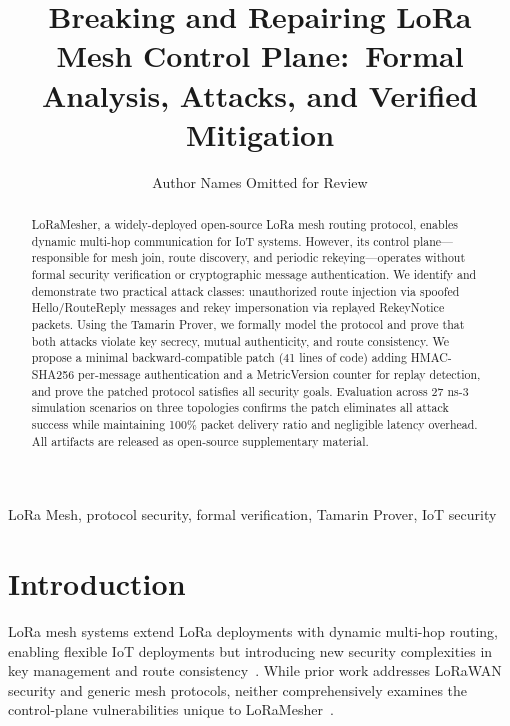\documentclass[10pt,journal]{IEEEtran}
\begin{document}
\title{Breaking and Repairing LoRa Mesh Control Plane:\ Formal Analysis, Attacks, and Verified Mitigation}
\author{Author Names Omitted for Review}
\maketitle

\begin{abstract}
	LoRaMesher, a widely-deployed open-source LoRa mesh routing protocol, enables dynamic multi-hop communication for IoT systems. However, its control plane—responsible for mesh join, route discovery, and periodic rekeying—operates without formal security verification or cryptographic message authentication. We identify and demonstrate two practical attack classes: unauthorized route injection via spoofed Hello/RouteReply messages and rekey impersonation via replayed RekeyNotice packets. Using the Tamarin Prover, we formally model the protocol and prove that both attacks violate key secrecy, mutual authenticity, and route consistency. We propose a minimal backward-compatible patch (41 lines of code) adding HMAC-SHA256 per-message authentication and a MetricVersion counter for replay detection, and prove the patched protocol satisfies all security goals. Evaluation across 27 ns-3 simulation scenarios on three topologies confirms the patch eliminates all attack success while maintaining 100\% packet delivery ratio and negligible latency overhead. All artifacts are released as open-source supplementary material.
\end{abstract}

\begin{IEEEkeywords}
	LoRa Mesh, protocol security, formal verification, Tamarin Prover, IoT security
\end{IEEEkeywords}

\section{Introduction}

LoRa mesh systems extend LoRa deployments with dynamic multi-hop routing, enabling flexible IoT deployments but introducing new security complexities in key management and route consistency~\cite{repetto2025-lorawan-drone-attack,shelby2026-zero-trust-iot}. While prior work addresses LoRaWAN security and generic mesh protocols, neither comprehensively examines the control-plane vulnerabilities unique to LoRaMesher~\cite{ieee2025-adr-eventb,ieee2025-lorawan-key-vulnerability}.
\end{document}
